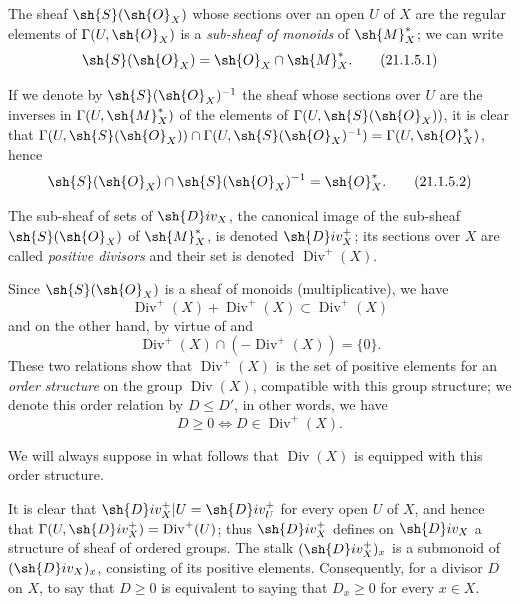 \begin{env}[21.1.5]
\label{IV.21.1.5}
The sheaf $\sh{S}(\sh{O}_X)$  whose sections over an open $U$ of $X$ are the regular elements of $\Gamma(U,\sh{O}_X)$ is a \emph{sub-sheaf of monoids} of $\sh{M}_X^*$;
we can write
\[
\label{IV.21.1.5.1}
  \sh{S}(\sh{O}_X)=\sh{O}_X\cap\sh{M}_X^*.
  \tag{21.1.5.1}
\]
\end{env}


If we denote by $\sh{S}(\sh{O}_X)^{-1}$ the sheaf whose sections over $U$ are the inverses in $\Gamma(U,\sh{M}_X^*)$ of the elements of $\Gamma(U,\sh{S}(\sh{O}_X))$, it is clear that $\Gamma(U,\sh{S}(\sh{O}_X))\cap\Gamma(U,\sh{S}(\sh{O}_X)^{-1})=\Gamma(U,\sh{O}_X^*)$, hence
\[
\label{IV.21.1.5.2}
  \sh{S}(\sh{O}_X)\cap\sh{S}(\sh{O}_X)^{-1}=\sh{O}_X^*.
  \tag{21.1.5.2}
\]

\begin{definition}[21.1.6]
\label{IV.21.1.6}
The sub-sheaf of sets of $\sh{D}iv_X$, the canonical image of the sub-sheaf $\sh{S}(\sh{O}_X)$ of $\sh{M}_X^*$, is denoted $\sh{D}iv_X^+$;
its sections over $X$ are called \emph{positive divisors} and their set is denoted $\operatorname{Div}^+(X)$.
\end{definition}

Since $\sh{S}(\sh{O}_X)$ is a sheaf of monoids (multiplicative), we have
\[
\label{IV.21.1.6.1}
  \operatorname{Div}^+(X)+\operatorname{Div}^+(X)\subset\operatorname{Div}^+(X)
  \tag{21.1.6.1}
\]
and on the other hand, by virtue of  and 
\[
\label{IV.21.1.6.2}
  \operatorname{Div}^+(X)\cap(-\operatorname{Div}^+(X))=\{0\}.
  \tag{21.1.6.2}
\]
These two relations show that $\operatorname{Div}^+(X)$ is the set of positive elements for an \emph{order structure} on the group $\operatorname{Div}(X)$, compatible with this group structure;
we denote this order relation by $D\leq D'$, in other words, we have
\[
\label{IV.21.1.6.3}
  D\geq 0 \iff D\in\operatorname{Div}^+(X).
  \tag{21.1.6.3}
\]

We will always suppose in what follows that $\operatorname{Div}(X)$ is equipped with this order structure.

It is clear that $\sh{D}iv_X^+|U=\sh{D}iv_U^+$ for every open $U$ of $X$, and hence that
$\Gamma(U,\sh{D}iv_X^+)=\operatorname{Div}^+(U)$;
thus $\sh{D}iv_X^+$ defines on $\sh{D}iv_X$ a structure of sheaf of ordered groups.
The stalk $(\sh{D}iv_X^+)_x$ is a submonoid of $(\sh{D}iv_X)_x$, consisting of its positive elements.
Consequently, for a divisor $D$ on $X$, to say that $D\geq0$ is equivalent to saying that $D_x\geq0$ for every $x\in X$.

